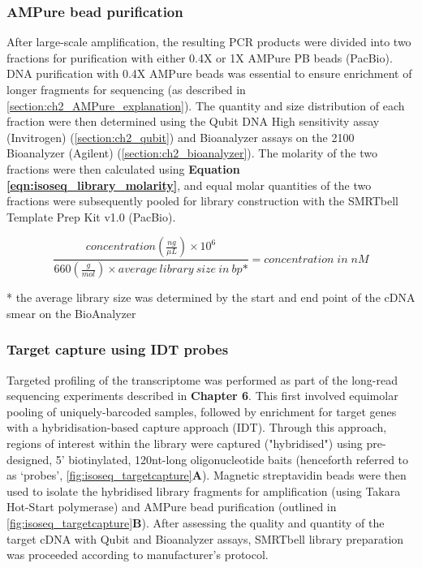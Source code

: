 \subsubsection{AMPure bead purification} 
\label{section:ch2_ampurebead_pool} 
After large-scale amplification, the resulting PCR products were divided into two fractions for purification with either 0.4X or 1X AMPure PB beads (PacBio). DNA purification with 0.4X AMPure beads was essential to ensure enrichment of longer fragments for sequencing (as described in \cref{section:ch2_AMPure_explanation}). The quantity and size distribution of each fraction were then determined using the Qubit DNA High sensitivity assay (Invitrogen) (\cref{section:ch2_qubit}) and Bioanalyzer assays on the 2100 Bioanalyzer (Agilent) (\cref{section:ch2_bioanalyzer}). The molarity of the two fractions were then calculated using \textbf{Equation \ref{eqn:isoseq_library_molarity}}, and equal molar quantities of the two fractions were subsequently pooled for library construction with the SMRTbell Template Prep Kit v1.0 (PacBio). 

\begin{equation}
	\label{eqn:isoseq_library_molarity}
	\frac{concentration(\frac{ng}{\mu L})\times 10^6}{660(\frac{g}{mol}) \times average\:library\:size\:in\:bp\mbox{*}} = concentration\;in\; nM
\end{equation}

* the average library size was determined by the start and end point of the cDNA smear on the BioAnalyzer

\subsubsection{Target capture using IDT probes} 
\label{section:ch2_targetcapture_explanation} 
Targeted profiling of the transcriptome was performed as part of the long-read sequencing experiments described in \textbf{Chapter 6}. This first involved equimolar pooling of uniquely-barcoded samples, followed by enrichment for target genes with a hybridisation-based capture approach (IDT). Through this approach, regions of interest within the library were captured ("hybridised") using pre-designed, 5’ biotinylated, 120nt-long oligonucleotide baits (henceforth referred to as ‘probes', \cref{fig:isoseq_targetcapture}\textbf{A}). Magnetic streptavidin beads were then used to isolate the hybridised library fragments for amplification (using Takara Hot-Start polymerase) and AMPure bead purification (outlined in \cref{fig:isoseq_targetcapture}\textbf{B}). After assessing the quality and quantity of the target cDNA with Qubit and Bioanalyzer assays, SMRTbell library preparation was proceeded according to manufacturer's protocol.  

